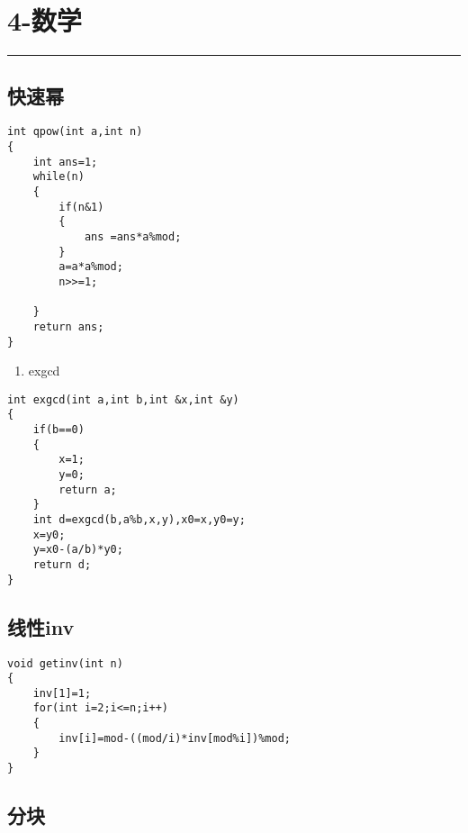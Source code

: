 \documentclass[]{article}
\providecommand{\tightlist}{%
  \setlength{\itemsep}{0pt}\setlength{\parskip}{0pt}}
\begin{document}
\hypertarget{ux6570ux5b66}{%
\section{4-数学}\label{ux6570ux5b66}}

\begin{center}\rule{0.5\linewidth}{0.5pt}\end{center}

\hypertarget{ux5febux901fux5e42}{%
\subsection{快速幂}\label{ux5febux901fux5e42}}

\begin{verbatim}
int qpow(int a,int n)
{
    int ans=1;
    while(n)
    {
        if(n&1)
        {
            ans =ans*a%mod;
        }
        a=a*a%mod;
        n>>=1;

    }
    return ans;
}
\end{verbatim}

\begin{enumerate}
\def\labelenumi{\arabic{enumi}.}
\setcounter{enumi}{1}
\tightlist
\item
  exgcd
\end{enumerate}

\begin{verbatim}
int exgcd(int a,int b,int &x,int &y)
{
    if(b==0)
    {
        x=1;
        y=0;
        return a;
    }
    int d=exgcd(b,a%b,x,y),x0=x,y0=y;
    x=y0;
    y=x0-(a/b)*y0;
    return d;
}
\end{verbatim}

\hypertarget{ux7ebfux6027inv}{%
\subsection{线性inv}\label{ux7ebfux6027inv}}

\begin{verbatim}
void getinv(int n)
{
    inv[1]=1;
    for(int i=2;i<=n;i++)
    {
        inv[i]=mod-((mod/i)*inv[mod%i])%mod;
    }
}
\end{verbatim}

\hypertarget{ux5206ux5757}{%
\subsection{分块}\label{ux5206ux5757}}
\end{document}
